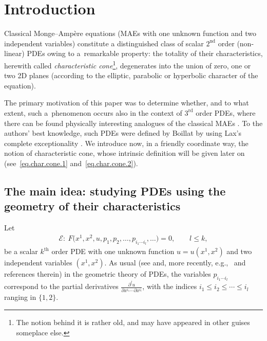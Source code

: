 \documentclass[pdftex]{sigma}
\newcommand{\E}{\mathcal{E}}
\newcommand{\Th}{^\textrm{th}}
\newcommand{\Rd}{^\textrm{rd}}
\newcommand{\Nd}{^\textrm{nd}}
\numberwithin{equation}{section}
\begin{document}


\renewcommand{\thefootnote}{\arabic{footnote}}
\setcounter{footnote}{0}

\section{Introduction}

Classical Monge--Amp\`ere equations (MAEs with one unknown function and two independent variables) constitute a distinguished class of scalar
$2\Nd$ order (non-linear) PDEs owing to a~remarkable property: the totality of their characteristics, herewith called
\emph{characteristic cone}\footnote{The notion behind it is rather old, and may have appeared in other
guises someplace else.}, degenerates into the union of zero, one or two 2D planes (according to the elliptic, parabolic or hyperbolic character of the equation).

The primary motivation of this paper was to determine whether, and to what extent, such a~phenomenon occurs also in the context of $3\Rd$ order PDEs, where there can be found physically interesting analogues of the classical MAEs \cite{MR1925763,MR2369200,MR1397274,MR1958112,MR1372461}. To the authors' best knowledge, such PDEs were def\/ined by Boillat by using Lax's complete exceptionality \cite{MR1139843,MR1194520, MR0067317}.
We introduce now, in a friendly coordinate way, the notion of characteristic cone, whose intrinsic def\/inition will be given later on (see~\eqref{eq.char.cone.1} and~\eqref{eq.char.cone.2}).

\subsection*{The main idea: studying PDEs using the geometry of their characteristics}\label{secIntroCarCone}
Let
\begin{gather}\label{equation}
\E\colon \ F\big(x^1,x^2,u,p_1,p_2,\dots,p_{i_1\cdots i_l},\dots\big)=0 , \qquad l \leq k,
\end{gather}
be a scalar
$k\Th$ order PDE with one unknown function $u=u(x^1,x^2)$ and two independent variables $(x^1,x^2)$.
As usual (see \cite{MR1504329} and, more recently, e.g.,~\cite{MR2813504,MR2389645} and references therein)
in the geometric theory of PDEs, the variables $p_{i_1\cdots i_l}$ correspond to the partial derivatives $\frac{\partial^{l}u}{\partial x^{i_1}\cdots\partial x^{i_l}}$, with the indices $ i_1\leq i_2\leq \cdots\leq i_l$ ranging in $ \{1, 2\}$.
\end{document}
